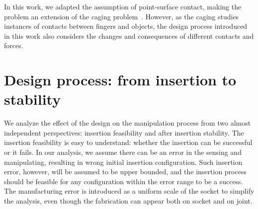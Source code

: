 \documentclass[letterpaper, 10 pt, conference]{ieeeconf}
\begin{document}
In this work, we adapted the assumption of point-surface contact, making the problem an extension of the caging problem~\cite{RimonBlack96, Rodriguez2010}. However, as the caging studies instances of contacts between fingers and objects, the design process introduced in this work also considers the changes and consequences of different contacts and forces. 



\section{Design process: from insertion to stability}

We analyze the effect of the design on the manipulation process from two almost independent perspectives: insertion feasibility and after insertion stability. The insertion feasibility is easy to understand: whether the insertion can be successful or it fails. In our analysis, we assume there can be an error in the sensing and manipulating, resulting in wrong initial insertion configuration. Such insertion error, however, will be assumed to be upper bounded, and the insertion process should be feasible for any configuration within the error range to be a success. The manufacturing error is introduced as a uniform scale of the socket to simplify the analysis, even though the fabrication can appear both on socket and on joint. 
\end{document}

